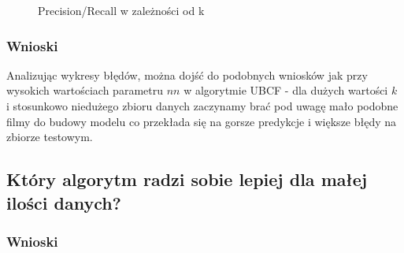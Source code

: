 \documentclass[12pt, a4paper]{article}
\begin{document}
\begin{figure}[H]
  \begin{center}
  \end{center}
  \caption{Precision/Recall w zależności od k}
  \label{fig:ubcf-nn-rmse}
\end{figure}



\subsubsection{Wnioski}
Analizując wykresy błędów, można dojść do podobnych wniosków jak przy wysokich wartościach parametru $nn$ w algorytmie UBCF - dla dużych wartości $k$ i stosunkowo niedużego zbioru danych zaczynamy brać pod uwagę mało podobne filmy do budowy modelu co przekłada się na gorsze predykcje i większe błędy na zbiorze testowym.


\subsection{Który algorytm radzi sobie lepiej dla małej ilości danych?}

\subsubsection{Wnioski}
\end{document}
